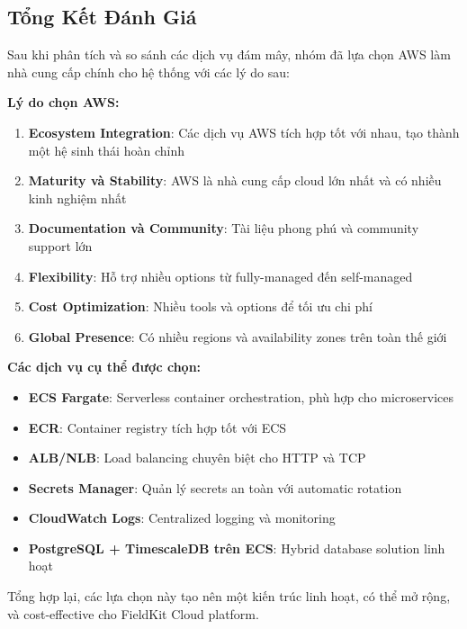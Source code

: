 \subsection{Tổng Kết Đánh Giá}

Sau khi phân tích và so sánh các dịch vụ đám mây, nhóm đã lựa chọn AWS làm nhà cung cấp chính cho hệ thống với các lý do sau:

\textbf{Lý do chọn AWS:}
\begin{enumerate}
    \item \textbf{Ecosystem Integration}: Các dịch vụ AWS tích hợp tốt với nhau, tạo thành một hệ sinh thái hoàn chỉnh
    \item \textbf{Maturity và Stability}: AWS là nhà cung cấp cloud lớn nhất và có nhiều kinh nghiệm nhất
    \item \textbf{Documentation và Community}: Tài liệu phong phú và community support lớn
    \item \textbf{Flexibility}: Hỗ trợ nhiều options từ fully-managed đến self-managed
    \item \textbf{Cost Optimization}: Nhiều tools và options để tối ưu chi phí
    \item \textbf{Global Presence}: Có nhiều regions và availability zones trên toàn thế giới
\end{enumerate}

\textbf{Các dịch vụ cụ thể được chọn:}
\begin{itemize}
    \item \textbf{ECS Fargate}: Serverless container orchestration, phù hợp cho microservices
    \item \textbf{ECR}: Container registry tích hợp tốt với ECS
    \item \textbf{ALB/NLB}: Load balancing chuyên biệt cho HTTP và TCP
    \item \textbf{Secrets Manager}: Quản lý secrets an toàn với automatic rotation
    \item \textbf{CloudWatch Logs}: Centralized logging và monitoring
    \item \textbf{PostgreSQL + TimescaleDB trên ECS}: Hybrid database solution linh hoạt
\end{itemize}

Tổng hợp lại, các lựa chọn này tạo nên một kiến trúc linh hoạt, có thể mở rộng, và cost-effective cho FieldKit Cloud platform.

